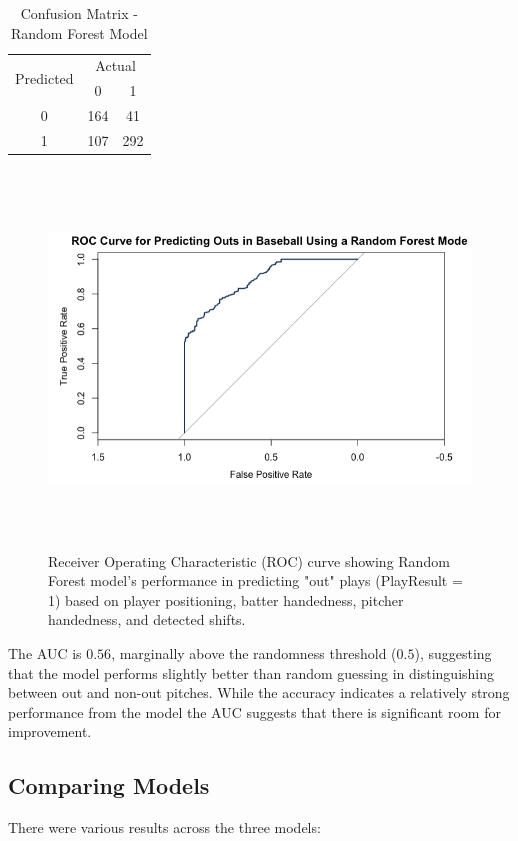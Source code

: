 \documentclass{article}
\begin{document}
\begin{table}[h!]
\centering
\begin{tabular}{|c|c|c|}
\hline
\multirow{2}{*}{Predicted} & \multicolumn{2}{c|}{Actual} \\ \cline{2-3} 
                           & 0   & 1   \\ \hline
0                          & 164  & 41  \\ \hline
1                          & 107 & 292 \\ \hline
\end{tabular}
\caption{Confusion Matrix - Random Forest Model}
\end{table}
\vspace{.4cm}
\begin{figure}[h]
    \centering
    \includegraphics[height=10cm]{images/roc_rf.png}
    \caption{Receiver Operating Characteristic (ROC) curve showing Random Forest model's performance in predicting "out" plays (PlayResult = 1) based on player positioning, batter handedness, pitcher handedness, and detected shifts.}
\end{figure}
\vspace{.7cm}

The AUC is $0.56$, marginally above the randomness threshold ($0.5$), suggesting that the model performs slightly better than random guessing in distinguishing between out and non-out pitches. While the accuracy indicates a relatively strong performance from the model the AUC suggests that there is significant room for improvement.

\subsection{Comparing Models}
There were various results across the three models: 
\end{document}
